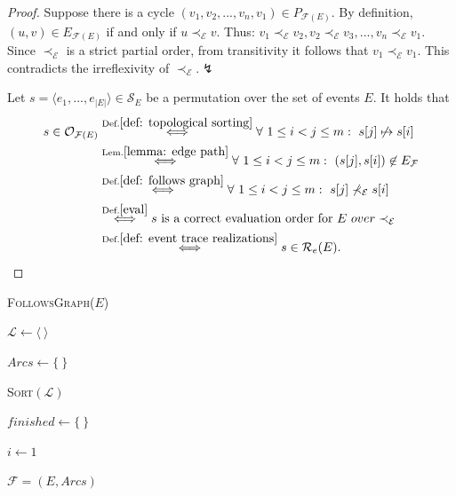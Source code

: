 \begin{proof}
Suppose there is a cycle $(v_1,v_2,...,v_n,v_1) \in P_{\mathcal{F}(E)}$.
By definition, $(u,v)\in E_{\mathcal{F}(E)}$ if and only if $u \prec_{\mathcal{E}} v$.
Thus: $v_1 \prec_{\mathcal{E}} v_2, v_2 \prec_{\mathcal{E}} v_3, ..., v_n \prec_{\mathcal{E}} v_1$.
Since $\prec_{\mathcal{E}}$ is a strict partial order, from transitivity it follows that $v_1 \prec_{\mathcal{E}} v_1$.
This contradicts the irreflexivity of $\prec_{\mathcal{E}}. \lightning$

Let $s = \langle e_1,...,e_{|E|} \rangle \in \mathcal{S}_E$ be a permutation over the set of events $E$.
It holds that 
\begin{align*}
s \in \mathcal{O}_{\mathcal{F}(E)} 
&\overset{\text{Def.} \ref{def: topological sorting}}{\Longleftrightarrow} 
\forall ~ 1 \leq i < j \leq m: ~ s[j] \not \mapsto s[i] \\ 
&\overset{\text{Lem.} \ref{lemma: edge path}}{\Longleftrightarrow} 
\forall ~ 1 \leq i < j \leq m: ~
(s[j],s[i]) \not \in E_{\mathcal{F}} \\
&\overset{\text{Def.} \ref{def: follows graph}}{\Longleftrightarrow} 
\forall ~ 1 \leq i < j \leq m: ~
s[j] \not \prec_{\mathcal{E}} s[i] \\
&\overset{\text{Def.} \ref{eval}}{\Longleftrightarrow} 
 s \text{ is a correct evaluation order for } E~ over \prec_{\mathcal{E}} \\
&\overset{\text{Def.} \ref{def: event trace realizations}}{\Longleftrightarrow} 
s \in \mathcal{R}_e(E).
\end{align*} 
\end{proof}


\begin{algorithm}[h!]
	\caption{\textsc{FollowsGraph($E$)}}
	\label{alg:follows graph}
	
	$\mathcal{L} \gets \langle ~ \rangle$ 
	
	$Arcs \gets \{~\}$ 
	
	 \label{1: 5}
	
	\textsc{Sort}$(\mathcal{L})$  \label{1: 6}
	
	$finished \gets \{ ~ \}$ 
	
	$i \gets 1$
	
	
	\Return $\mathcal{F}=(E,Arcs)$
\end{algorithm}

